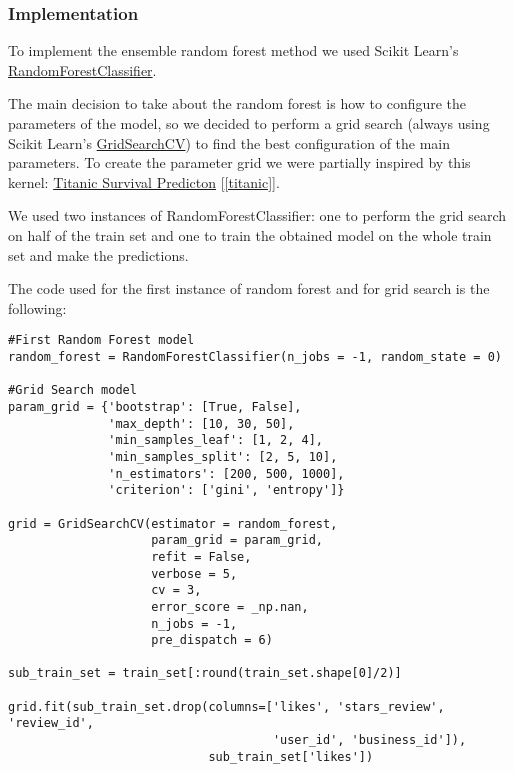 \subsubsection{Implementation}

To implement the ensemble random forest method we used Scikit Learn's \href{https://scikit-learn.org/stable/modules/generated/sklearn.ensemble.RandomForestClassifier.html}{RandomForestClassifier}.

The main decision to take about the random forest is how to configure the parameters of the model, so we decided to perform a grid search (always using Scikit Learn's \href{https://scikit-learn.org/stable/modules/generated/sklearn.model_selection.GridSearchCV.html}{GridSearchCV}) to find the best configuration of the main parameters. To create the parameter grid we were partially inspired by this kernel: \href{https://www.kaggle.com/sociopath00/random-forest-using-gridsearchcv}{Titanic Survival Predicton} [\ref{titanic}].

We used two instances of RandomForestClassifier: one to perform the grid search on half of the train set and one to train the obtained model on the whole train set and make the predictions.

The code used for the first instance of random forest and for grid search is the following:

\begin{lstlisting}[caption={Random Forest model},label={lst:rf-model}]
#First Random Forest model
random_forest = RandomForestClassifier(n_jobs = -1, random_state = 0)

#Grid Search model
param_grid = {'bootstrap': [True, False],
              'max_depth': [10, 30, 50],
              'min_samples_leaf': [1, 2, 4],
              'min_samples_split': [2, 5, 10],
              'n_estimators': [200, 500, 1000],
              'criterion': ['gini', 'entropy']}

grid = GridSearchCV(estimator = random_forest, 
                    param_grid = param_grid, 
                    refit = False, 
                    verbose = 5, 
                    cv = 3, 
                    error_score = _np.nan, 
                    n_jobs = -1, 
                    pre_dispatch = 6)

sub_train_set = train_set[:round(train_set.shape[0]/2)]

grid.fit(sub_train_set.drop(columns=['likes', 'stars_review', 'review_id', 
                                     'user_id', 'business_id']),
                            sub_train_set['likes'])
\end{lstlisting}

